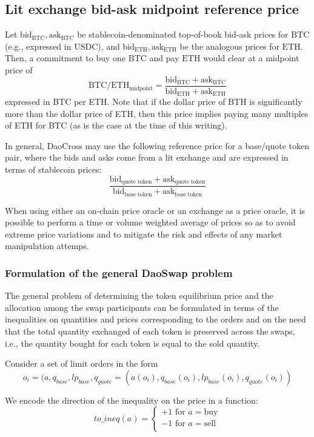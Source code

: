 \documentclass[11pt, reqno]{amsart}
\newcommand{\bidbtc}{\mathrm{bid}_\mathrm{BTC}}
\newcommand{\askbtc}{\mathrm{ask}_\mathrm{BTC}}
\newcommand{\bideth}{\mathrm{bid}_\mathrm{ETH}}
\newcommand{\asketh}{\mathrm{ask}_\mathrm{ETH}}
\newcommand{\bidbase}{\mathrm{bid}_\mathrm{quote\;token}}
\newcommand{\askbase}{\mathrm{ask}_\mathrm{quote\;token}}
\newcommand{\bidquote}{\mathrm{bid}_\mathrm{base\;token}}
\newcommand{\askquote}{\mathrm{ask}_\mathrm{base\;token}}
\newcommand{\BTC}{\mathrm{BTC}}
\newcommand{\ETH}{\mathrm{ETH}}
\newcommand{\USDC}{\mathrm{USDC}}
\newcommand{\midpoint}{\mathrm{midpoint}}
\begin{document}
\subsection{Lit exchange bid-ask midpoint reference price}
Let $\bidbtc, \askbtc$ be stablecoin-denominated top-of-book bid-ask prices
for $\BTC$ (e.g., expressed in $\USDC$), and $\bideth, \asketh$ be the analogous
prices for $\ETH$. Then, a commitment to buy one $\BTC$ and pay $\ETH$ would
clear at a midpoint price of
\[
	\BTC/\ETH_{\midpoint} = \frac{\bidbtc + \askbtc}{\bideth + \asketh}
\]
expressed in BTC per ETH. Note that if the dollar price of BTH is significantly
more than the dollar price of ETH, then this price implies paying many
multiples of ETH for BTC (as is the case at the time of this writing).

In general, DaoCross may use the following reference price for a base/quote
token pair, where the bids and asks come from a lit exchange and are expressed
in terms of stablecoin prices:
\begin{equation}
	\frac{\bidbase + \askbase}{\bidquote + \askquote}
\end{equation}

When using either an on-chain price oracle or an exchange as a price oracle,
it is possible to perform a time or volume weighted average of prices so as
to avoid extreme price variations and to mitigate the risk and effects of any
market manipulation attemps.

\subsubsection{Formulation of the general DaoSwap problem}
The general problem of determining the token equilibrium price and the
allocation among the swap participants can be formulated in terms of the
inequalities on quantities and prices corresponding to the orders and on the
need that the total quantity exchanged of each token is preserved across the
swaps, i.e., the quantity bought for each token is equal to the sold quantity.

Consider a set of limit orders in the form
$$o_i = (a, q_{base}, lp_{base}, q_{quote} = (a(o_i), q_{base}(o_i), lp_{base}(o_i), q_{quote}(o_i))$$

We encode the direction of the inequality on the price in a function:
$$
\mathit{to\_ineq}(a) =
\begin{cases}
  +1 \text{ for } a = \text{buy} \\
  -1 \text{ for } a = \text{sell} \\
\end{cases}
$$
\end{document}
